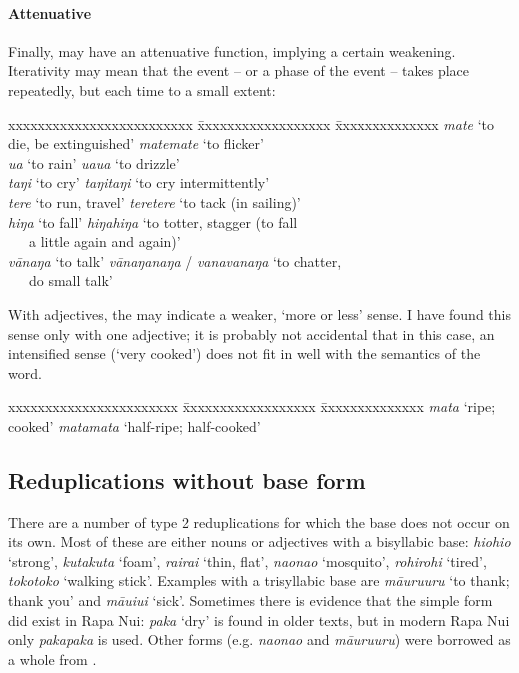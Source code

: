 \paragraph{Attenuative}\label{sec:2.6.2.2.7} Finally,  may have an attenuative function, implying a certain weakening. Iterativity may mean that the event – or a phase of the event – takes place repeatedly, but each time to a small extent:
\ea 
\begin{tabbing}
 xxxxxxxxxxxxxxxxxxxxxxxxx \= xxxxxxxxxxxxxxxxxx \= xxxxxxxxxxxxxx \kill
  \textit{mate} ‘to die, be extinguished’ \> \textit{matemate} ‘to flicker’\\
  \textit{{\ꞌ}ua} ‘to rain’ \> \textit{{\ꞌ}ua{\ꞌ}ua} ‘to drizzle’\\
  \textit{taŋi} ‘to cry’ \> \textit{taŋitaŋi} ‘to cry intermittently’\\
  \textit{tere} ‘to run, travel’ \> \textit{teretere} ‘to tack (in sailing)’\\
  \textit{hiŋa} ‘to fall’  \>\textit{hiŋahiŋa} ‘to totter, stagger (to fall \\
 \> ~~~a little again and again)’\\
  \textit{vānaŋa} ‘to talk’ \> \textit{vānaŋanaŋa} / \textit{vanavanaŋa} ‘to chatter, \\
 \> ~~~do small talk’
\end{tabbing}
\z 
With adjectives, the  may indicate a weaker, ‘more or less’ sense. I have found this sense only with one adjective; it is probably not accidental that in this case, an intensified sense (‘very cooked’) does not fit in well with the semantics of the word.

\ea 
\begin{tabbing}
xxxxxxxxxxxxxxxxxxxxxxx \= xxxxxxxxxxxxxxxxxx \= xxxxxxxxxxxxxx \kill
  \textit{mata} ‘ripe; cooked’ \> \textit{matamata} ‘half-ripe; half-cooked’
\end{tabbing}\z 
\subsection{Reduplications without base form}\label{sec:2.6.3}

There are a number of type 2 reduplications for which the base does not occur on its own. Most of these are either nouns or adjectives with a bisyllabic base: \textit{hiohio} ‘strong’, \textit{kutakuta} ‘foam’, \textit{rairai} ‘thin, flat’, \textit{naonao} ‘mosquito’, \textit{rohirohi} ‘tired’, \textit{tokotoko} ‘walking stick’. Examples with a trisyllabic base are \textit{māuruuru} ‘to thank; thank you’ and \textit{māuiui} ‘sick’. Sometimes there is evidence that the simple form did exist in Rapa Nui: \textit{paka} ‘dry’ is found in older texts, but in modern Rapa Nui only \textit{pakapaka} is used. Other forms (e.g. \textit{naonao} and \textit{māuruuru}) were borrowed as a whole from .

